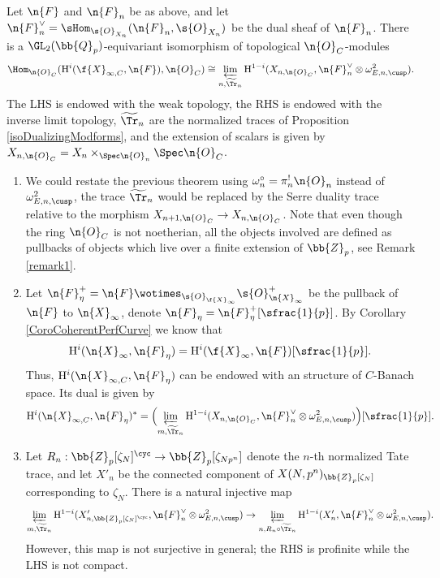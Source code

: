 \begin{theo}
\label{TheoDualityinfinite}
Let $\n{F}$ and $\n{F}_n$ be as above, and let $\n{F}_n^\vee= \sHom_{\s{O}_{X_n}}(\n{F}_n, \s{O}_{X_n})$ be the dual sheaf of $\n{F}_n$. There is a $\GL_2(\bb{Q}_p)$-equivariant isomorphism of topological $\n{O}_C$-modules
\begin{equation}
\label{eqInftyduality}
\Hom_{\n{O}_C}(\mathrm{H}^i (\f{X}_{\infty,C}, \n{F}), \n{O}_C) \cong \varprojlim_{n, \widetilde{\Tr}_n} \mathrm{H}^{1-i}(X_{n,\n{O}_C}, \n{F}_n^{\vee} \otimes \omega^2_{E,n,\cusp}).
\end{equation}
The LHS is endowed with the weak topology, the RHS is endowed with the inverse limit topology, $\widetilde{\Tr}_n$ are the normalized traces of Proposition \ref{isoDualizingModforms}, and the extension of scalars is given by $X_{n,\n{O}_C}=X_{n}\times_{\Spec \n{O}_n} \Spec \n{O}_C$.
\end{theo}

\skpt
\begin{remark}
\label{RemarkDualityinfty}
\begin{enumerate}

\item\label{RemarkDualityinfty1}
We could restate the previous theorem using $\omega^{\circ}_{n}= \pi_n^! \n{O}_n$ instead of $\omega^2_{E,n,\cusp}$, the trace $\widetilde{\Tr}_n$ would be replaced by the Serre duality trace relative to the morphism $X_{n+1, \n{O}_C}\to X_{n,\n{O}_C}$. Note that even though the ring $\n{O}_C$ is not noetherian, all the objects involved are defined as pullbacks of objects which live over a finite extension of $\bb{Z}_p$, see Remark \ref{remark1}.

\item\label{RemarkDualityinfty2}
Let $\n{F}^+_{\eta}= \n{F}\wotimes_{\s{O}_{\f{X}_{\infty}}} \s{O}^+_{\n{X}_{\infty}}$ be the pullback of $\n{F}$ to $\n{X}_{\infty}$, denote $\n{F}_{\eta}= \n{F}^+_{\eta}[\sfrac{1}{p}]$. By Corollary \ref{CoroCoherentPerfCurve} we know that
\[
\mathrm{H}^i(\n{X}_{\infty}, \n{F}_{\eta}) = \mathrm{H}^i(\f{X}_{\infty}, \n{F})[\sfrac{1}{p}].
\]
Thus, $\mathrm{H}^i(\n{X}_{\infty,C}, \n{F}_{\eta}) $ can be endowed with an structure of $C$-Banach space. Its dual is given by
\[
\mathrm{H}^i(\n{X}_{\infty, C}, \n{F}_{\eta})^* = \Bigl(\varprojlim_{m, \widetilde{\Tr}_n} \mathrm{H}^{1-i}(X_{n,\n{O}_C}, \n{F}_n^\vee \otimes \omega^2_{E,n,\cusp})\Bigr)[\sfrac{1}{p}].
\]

\item\label{RemarkDualityinfty3}
Let $R_n: \bb{Z}_p[\zeta_{N}]^{\cyc}\to \bb{Z}_p[\zeta_{Np^n}]$ denote the $n$-th normalized Tate trace, and let $X'_n$ be the connected component of $X(N,p^n)_{\bb{Z}_p[\zeta_{N}]}$ corresponding to $\zeta_N$. There is a natural injective map
\[
\varprojlim_{m , \widetilde{\Tr}_n} \mathrm{H}^{1-i}(X'_{n,\bb{Z}_p[\zeta_N]^{\cyc}}, \n{F}_n^\vee \otimes \omega^2_{E,n,\cusp}) \to \varprojlim_{n, R_n\circ \widetilde{\Tr}_n} \mathrm{H}^{1-i}(X'_{n}, \n{F}_n^\vee \otimes \omega^2_{E,n,\cusp}).
\]
However, this map is not surjective in general; the RHS is profinite while the LHS is not compact.
\end{enumerate}
\end{remark}

